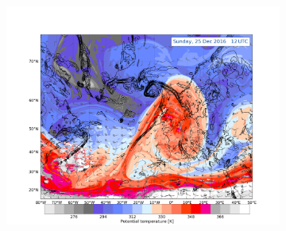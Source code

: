 \begin{figure}[t!]
	\begin{subfigure}[b]{\textwidth}
		\includegraphics[trim={4.2cm 0cm 4.3cm 36.8cm},clip,
		width=\textwidth]{./fig_DynTropo/20161225_12}
	\end{subfigure}
\end{figure}
%
